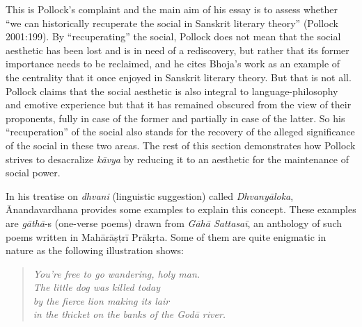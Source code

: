 This is Pollock's complaint and the main aim of his essay is to assess whether ``we can historically recuperate the social in Sanskrit literary theory'' (Pollock 2001:199). By ``recuperating'' the social, Pollock does not mean that the social aesthetic has been lost and is in need of a rediscovery, but rather that its former importance needs to be reclaimed, and he cites Bhoja's work as an example of the centrality that it once enjoyed in Sanskrit literary theory. But that is not all. Pollock claims that the social aesthetic is also integral to language-philosophy and emotive experience but that it has remained obscured from the view of their proponents, fully in case of the former and partially in case of the latter. So his ``recuperation'' of the social also stands for the recovery of the alleged significance of the social in these two areas. The rest of this section demonstrates how Pollock strives to desacralize \textsl{kāvya} by reducing it to an aesthetic for the maintenance of social power.

In his treatise on \textsl{dhvani} (linguistic suggestion) called \textsl{Dhvanyāloka}, Ānandavardhana provides some examples to explain this concept. These examples are \textsl{gāthā}-s (one-verse poems) drawn from \textsl{Gāhā Sattasaī}, an anthology of such poems written in Mahārāṣṭrī Prākṛta. Some of them are quite enigmatic in nature as the following illustration shows:\\[-15pt]
\begin{quote}
\textsl{You’re free to go wandering, holy man.}\\
\textsl{The little dog was killed today}\\
\textsl{by the fierce lion making its lair}\\
\textsl{in the thicket on the banks of the Godā river.}\\[-15pt]
\end{quote}

